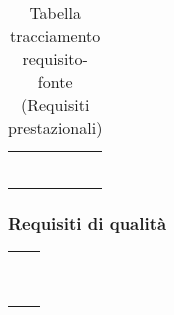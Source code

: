 {{{{{\def\tabularxcolumn#1{m{#1}}
{
	\begin{center}
		\renewcommand{\arraystretch}{1.4}
		\begin{longtable}{|p{7.5cm}|p{7.5cm}|}
		\hline
		\rowcolor{airforceblue}
		\makecell[tc]{\textbf{Codice RS}} & \makecell[c]{\textbf{Fonte}}  \\
		\hline
		\makecell[tc]{RSPO1} & \makecell[tc]{Capitolato$_{\scaleto{G}{3pt}}$}\\
		\hline
		\makecell[tc]{RSPO2} & \makecell[tc]{Interno}\\
		\hline
		\makecell[tc]{RSPO3} & \makecell[tc]{Interno}\\
		\hline
		\makecell[tc]{RSPO4} & \makecell[tc]{Interno}\\
		\hline
		\makecell[tc]{RSPF5} & \makecell[tc]{Interno}\\
		\hline
		\rowcolor{white}
		\caption[Tabella tracciamento requisito-fonte]{Tabella tracciamento requisito-fonte (Requisiti prestazionali)}\label{4.6}\\
	\end{longtable}
\end{center}

\subsubsection{Requisiti di qualità}\label{RequisitiTracciamentoDeiRequisitiFonteRequisitiDiQualita}

\def\tabularxcolumn#1{m{#1}}
{
\begin{center}
\renewcommand{\arraystretch}{1.4}
\begin{longtable}{|p{7.5cm}|p{7.5cm}|}
		\hline
		\rowcolor{airforceblue}
		\makecell[tc]{\textbf{Codice RS}} & \makecell[c]{\textbf{Fonte}}  \\
		\makecell[tc]{RSQO1} & \makecell[tc]{Interno}\\
		\hline
		\makecell[tc]{RSQF2} & \makecell[tc]{Interno}\\
		\hline
		\makecell[tc]{RSQF3} & \makecell[tc]{Interno }\\
		\hline
		\makecell[tc]{RSQF4} & \makecell[tc]{Interno}\\
		\hline
		\makecell[tc]{RSQO5} & \makecell[tc]{Capitolato$_{\scaleto{G}{3pt}}$}\\
		\hline
		\makecell[tc]{RSQO6} & \makecell[tc]{Capitolato$_{\scaleto{G}{3pt}}$}\\
		\hline
		\makecell[tc]{RSQO7} & \makecell[tc]{Capitolato$_{\scaleto{G}{3pt}}$}\\
		\hline
		\rowcolor{white}


\end{longtable}
\end{center}}}}}}}}

